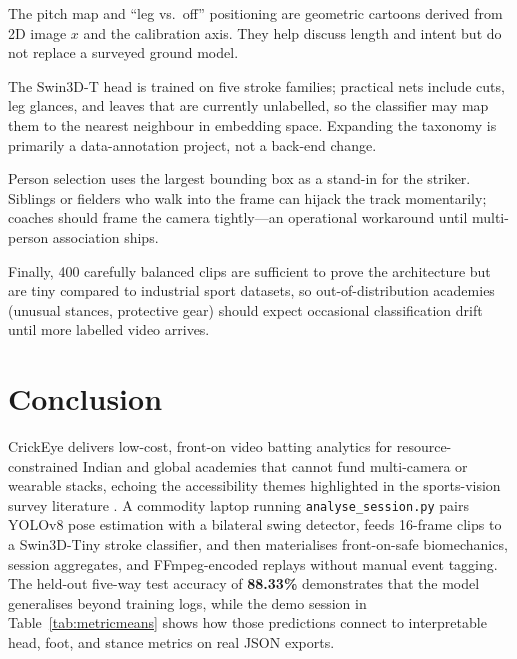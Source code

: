 \begin{justify}
\par The pitch map and ``leg vs.\ off'' positioning are geometric cartoons derived from 2D image $x$ and the calibration axis. They help discuss length and intent but do not replace a surveyed ground model.

\par The Swin3D-T head is trained on five stroke families; practical nets include cuts, leg glances, and leaves that are currently unlabelled, so the classifier may map them to the nearest neighbour in embedding space. Expanding the taxonomy is primarily a data-annotation project, not a back-end change.

\par Person selection uses the largest bounding box as a stand-in for the striker. Siblings or fielders who walk into the frame can hijack the track momentarily; coaches should frame the camera tightly---an operational workaround until multi-person association ships.

\par Finally, 400 carefully balanced clips are sufficient to prove the architecture but are tiny compared to industrial sport datasets, so out-of-distribution academies (unusual stances, protective gear) should expect occasional classification drift until more labelled video arrives.

\section{Conclusion}

CrickEye delivers low-cost, front-on video batting analytics for resource-constrained Indian and global academies that cannot fund multi-camera or wearable stacks, echoing the accessibility themes highlighted in the sports-vision survey literature \cite{Thomas2017}. A commodity laptop running \texttt{analyse\_session.py} pairs YOLOv8 pose estimation with a bilateral swing detector, feeds 16-frame clips to a Swin3D-Tiny stroke classifier, and then materialises front-on-safe biomechanics, session aggregates, and FFmpeg-encoded replays without manual event tagging. The held-out five-way test accuracy of \textbf{88.33\%} demonstrates that the model generalises beyond training logs, while the demo session in Table~\ref{tab:metricmeans} shows how those predictions connect to interpretable head, foot, and stance metrics on real JSON exports.


\end{justify}
